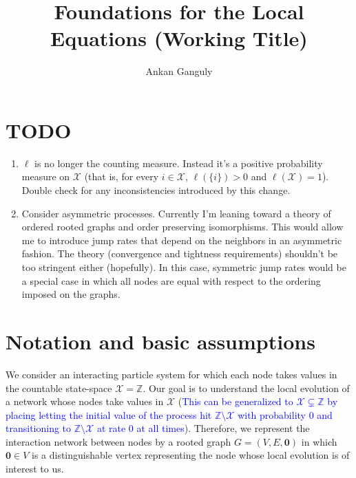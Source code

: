 \documentclass[12pt]{article}
\newcommand{\mb}{\mathbb}
\newcommand{\mc}{\mathcal}
\newcommand{\tb}{\textcolor{blue}}
\newcommand{\sta}{\mc{X}}							%
\renewcommand{\root}{\mathbf{0}}					%
\newcommand{\Sm}{\ell}								%
\begin{document}
\title{Foundations for the Local Equations (Working Title)}
\author{Ankan Ganguly}

\maketitle

\newpage

\tableofcontents

\newpage

\section{TODO}
\begin{enumerate}
\item \(\Sm\) is no longer the counting measure. Instead it's a positive probability measure on \(\sta\) (that is, for every \(i \in \sta\), \(\Sm(\{i\}) > 0\) and \(\Sm(\sta) = 1\)). Double check for any inconsistencies introduced by this change.

\item Consider asymmetric processes. Currently I'm leaning toward a theory of ordered rooted graphs and order preserving isomorphisms. This would allow me to introduce jump rates that depend on the neighbors in an asymmetric fashion. The theory (convergence and tightness requirements) shouldn't be too stringent either (hopefully). In this case, symmetric jump rates would be a special case in which all nodes are equal with respect to the ordering imposed on the graphs.
\end{enumerate}



\section{Notation and basic assumptions}
\label{not}

We consider an interacting particle system for which each node takes values in the countable state-space \(\sta = \mb{Z}\). Our goal is to understand the local evolution of a network whose nodes take values in \(\sta\) (\tb{This can be generalized to \(\sta \subsetneq \mb{Z}\) by placing letting the initial value of the process hit \(\mb{Z}\setminus \sta\) with probability 0 and transitioning to \(\mb{Z}\setminus \sta\) at rate 0 at all times}). Therefore, we represent the interaction network between nodes by a rooted graph \(G = (V,E,\root)\) in which \(\root \in V\) is a distinguishable vertex representing the node whose local evolution is of interest to us.
\end{document}
